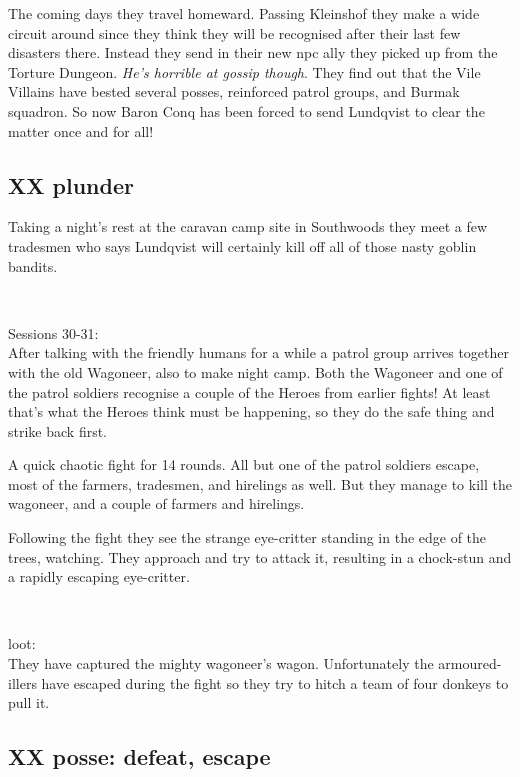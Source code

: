 The coming days they travel homeward. Passing Kleinshof they make a wide circuit around since they think they will be recognised after their last few disasters there. Instead they send in their new npc ally they picked up from the Torture Dungeon. \emph{He's horrible at gossip though}. They find out that the Vile Villains have bested several posses, reinforced patrol groups, and Burmak squadron. So now Baron Conq has been forced to send Lundqvist to clear the matter once and for all!


\subsection*{XX plunder}

Taking a night's rest at the caravan camp site in Southwoods they meet a few tradesmen who says Lundqvist will certainly kill off all of those nasty goblin bandits.

\


Sessions 30-31:\\
After talking with the friendly humans for a while a patrol group arrives together with the old Wagoneer, also to make night camp. Both the Wagoneer and one of the patrol soldiers recognise a couple of the Heroes from earlier fights! At least that's what the Heroes think must be happening, so they do the safe thing and strike back first.

A quick chaotic fight for 14 rounds. All but one of the patrol soldiers escape, most of the farmers, tradesmen, and hirelings as well. But they manage to kill the wagoneer, and a couple of farmers and hirelings.

Following the fight they see the strange eye-critter standing in the edge of the trees, watching. They approach and try to attack it, resulting in a chock-stun and a rapidly escaping eye-critter.

\

loot:\\
They have captured the mighty wagoneer's wagon. Unfortunately the armoured-illers have escaped during the fight so they try to hitch a team of four donkeys to pull it.


\subsection*{XX posse: defeat, escape}

